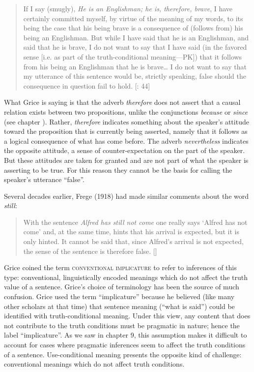 \begin{quote}
If I say (smugly), \textit{He is an Englishman; he is, therefore, brave}, I have certainly committed myself, by virtue of the meaning of my words, to its being the case that his being brave is a consequence of (follows from) his being an Englishman. But while I have said that he is an Englishman, and said that he is brave, I do not want to say that I have said (in the favored sense [i.e. as part of the truth-conditional meaning—PK]) that it follows from his being an Englishman that he is brave…  I do not want to say that my utterance of this sentence would be, strictly speaking, false should the consequence in question fail to hold.  [\citealt{Grice1975}: 44]
\end{quote}


What Grice is saying is that the adverb \textit{therefore} does not assert that a causal relation exists between two propositions, unlike the conjunctions \textit{because} or \textit{since} (see chapter ). Rather, \textit{therefore} indicates something about the speaker’s attitude toward the proposition that is currently being asserted, namely that it follows as a logical consequence of what has come before. The adverb \textit{nevertheless} indicates the opposite attitude, a sense of counter-expectation on the part of the speaker. But these attitudes are taken for granted and are not part of what the speaker is asserting to be true. For this reason they cannot be the basis for calling the speaker’s utterance “false”.



Several decades earlier, Frege (1918) had made similar comments about the word \textit{still}:


\begin{quote}
With the sentence \textit{Alfred has still not come} one really says ‘Alfred has not come’ and, at the same time, hints that his arrival is expected, but it is only hinted. It cannot be said that, since Alfred’s arrival is not expected, the sense of the sentence is therefore false. [\citealt{Frege1918}]
\end{quote}



Grice coined the term \textsc{conventional implicature} to refer to inferences of this type: conventional, linguistically encoded meanings which do not affect the truth value of a sentence. Grice’s choice of terminology has been the source of much confusion. Grice used the term “implicature” because he believed (like many other scholars at that time) that sentence meaning (“what is said”) could be identified with truth-conditional meaning. Under this view, any content that does not contribute to the truth conditions must be pragmatic in nature; hence the label “implicature”. As we saw in chapter 9, this assumption makes it difficult to account for cases where pragmatic inferences seem to affect the truth conditions of a sentence. Use-conditional meaning presents the opposite kind of challenge: conventional meanings which do not affect truth conditions.



